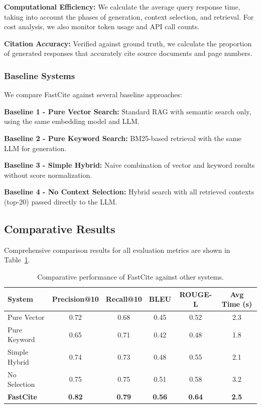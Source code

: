 \documentclass[runningheads]{llncs}
\begin{document}
\textbf{Computational Efficiency:} We calculate the average query response time, taking into account the phases of generation, context selection, and retrieval. For cost analysis, we also monitor token usage and API call counts.

\textbf{Citation Accuracy:} Verified against ground truth, we calculate the proportion of generated responses that accurately cite source documents and page numbers.

\subsubsection{Baseline Systems}

We compare FastCite against several baseline approaches:

\textbf{Baseline 1 - Pure Vector Search:} Standard RAG with semantic search only, using the same embedding model and LLM.

\textbf{Baseline 2 - Pure Keyword Search:} BM25-based retrieval with the same LLM for generation.

\textbf{Baseline 3 - Simple Hybrid:} Naive combination of vector and keyword results without score normalization.

\textbf{Baseline 4 - No Context Selection:} Hybrid search with all retrieved contexts (top-20) passed directly to the LLM.

\subsection{Comparative Results}

Comprehensive comparison results for all evaluation metrics are shown in Table~\ref{tab:comparison}.

\begin{table}
\caption{Comparative performance of FastCite against other systems.}
\label{tab:comparison}
\begin{tabular}{|l|c|c|c|c|c|}
\hline
\textbf{System} & \textbf{Precision@10} & \textbf{Recall@10} & \textbf{BLEU} & \textbf{ROUGE-L} & \textbf{Avg Time (s)} \\
\hline
Pure Vector & 0.72 & 0.68 & 0.45 & 0.52 & 2.3 \\
Pure Keyword & 0.65 & 0.71 & 0.42 & 0.48 & 1.8 \\
Simple Hybrid & 0.74 & 0.73 & 0.48 & 0.55 & 2.1 \\
No Selection & 0.75 & 0.75 & 0.51 & 0.58 & 3.2 \\
\textbf{FastCite} & \textbf{0.82} & \textbf{0.79} & \textbf{0.56} & \textbf{0.64} & \textbf{2.5} \\
\hline
\end{tabular}
\end{table}
\end{document}
